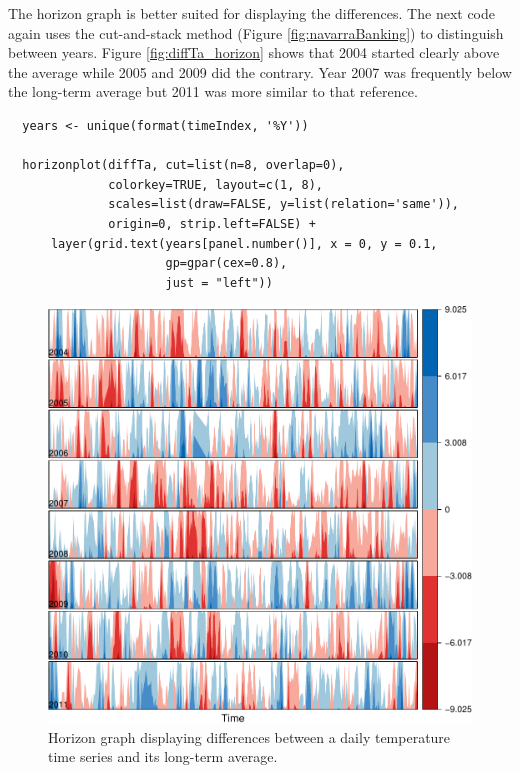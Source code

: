 \documentclass[smallroyalvopaper]{memoir}
\begin{document}
The horizon graph is better suited for displaying the differences. The
next code again uses the cut-and-stack method (Figure
\ref{fig:navarraBanking}) to distinguish between years. Figure
\ref{fig:diffTa_horizon} shows that 2004 started clearly above the
average while 2005 and 2009 did the contrary. Year 2007 was frequently
below the long-term average but 2011 was more similar to that
reference.
\lstset{language=r,label= ,caption= ,captionpos=b,numbers=none}
\begin{lstlisting}
  years <- unique(format(timeIndex, '%Y'))
  
  horizonplot(diffTa, cut=list(n=8, overlap=0),
              colorkey=TRUE, layout=c(1, 8),
              scales=list(draw=FALSE, y=list(relation='same')),
              origin=0, strip.left=FALSE) +
      layer(grid.text(years[panel.number()], x = 0, y = 0.1, 
                      gp=gpar(cex=0.8),
                      just = "left"))
\end{lstlisting}

\begin{figure}[htbp]
\centering
\includegraphics[width=.9\linewidth]{figs/diffTa_horizon.pdf}
\caption{\label{fig:orgad3631e}
Horizon graph displaying differences between a daily temperature time series and its long-term average.}
\end{figure}
\end{document}
